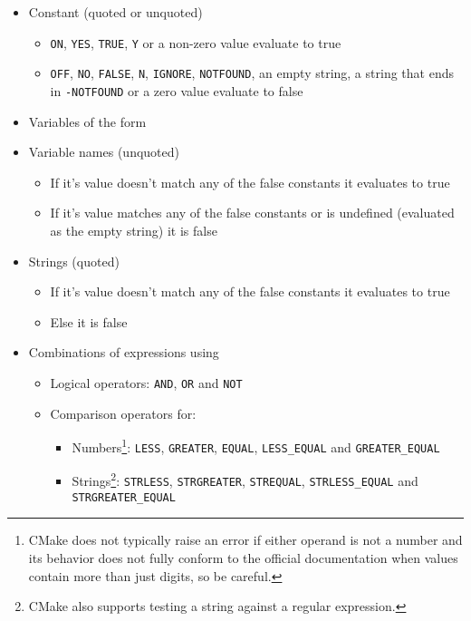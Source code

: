 \documentclass[8pt, table, xcdraw]{article}%
\begin{document}
\begin{itemize}
\item Constant (quoted or unquoted)
\begin{itemize}
    \item \lstinline{ON}, \lstinline{YES}, \lstinline{TRUE}, \lstinline{Y} or a non-zero value evaluate to true
    \item \lstinline{OFF}, \lstinline{NO}, \lstinline{FALSE}, \lstinline{N}, \lstinline{IGNORE}, \lstinline{NOTFOUND}, an empty string, a string that ends in \lstinline{-NOTFOUND} or a zero value evaluate to false
\end{itemize}
\item Variables of the form %
\item Variable names (unquoted)
\begin{itemize}
    \item If it's value doesn't match any of the false constants it evaluates to true
    \item If it's value matches any of the false constants or is undefined (evaluated as the empty string) it is false
\end{itemize}
\item Strings (quoted)
\begin{itemize}
    \item If it's value doesn't match any of the false constants it evaluates to true
    \item Else it is false
\end{itemize}
\item Combinations of expressions using
\begin{itemize}
    \item Logical operators: \lstinline{AND}, \lstinline{OR} and \lstinline{NOT}
    \item Comparison operators for:
    \begin{itemize}
        \item Numbers\footnote{CMake does not typically raise an error if either operand is not a number and its behavior does not fully conform to the official documentation when values contain more than just digits, so be careful.}: \lstinline{LESS}, \lstinline{GREATER}, \lstinline{EQUAL}, \lstinline{LESS_EQUAL} and \lstinline{GREATER_EQUAL}
        \item Strings\footnote{CMake also supports testing a string against a regular expression.}: \lstinline{STRLESS}, \lstinline{STRGREATER}, \lstinline{STREQUAL}, \lstinline{STRLESS_EQUAL} and \lstinline{STRGREATER_EQUAL}

\end{itemize}
\end{itemize}
\end{itemize}
\end{document}
